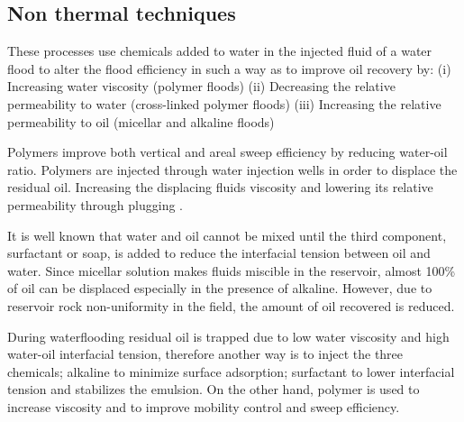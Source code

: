 \subsection{Non thermal techniques}
\begin{description}[style=nextline]
\item[\textbf{Chemical Flooding}]
These processes use chemicals added to water in the injected fluid of a water 
flood to alter the flood efficiency in such a way as to improve oil recovery by: 
(i) Increasing water viscosity (polymer floods) (ii) Decreasing the relative 
permeability to water (cross-linked polymer floods) (iii) Increasing the 
relative permeability to oil (micellar and alkaline floods)  \citep{Glover} 
\item[\textbf{Polymer flooding}]
Polymers improve both vertical and areal sweep efficiency by 
reducing water-oil ratio. Polymers are injected through water injection wells in 
order to displace the residual oil. Increasing the displacing fluids viscosity 
and lowering its relative permeability through plugging \citep{Anazi}. 
\item[\textbf{Micelalr polymer flooding}]
It is well known that water and oil cannot be mixed 
until the third component, surfactant or soap, is added to reduce the 
interfacial tension between oil and water. Since micellar solution makes fluids 
miscible in the reservoir, almost 100\% of oil can be displaced especially in the 
presence of alkaline. However, due to reservoir rock non-uniformity in the field, the amount of oil recovered is reduced. 
\item[\textbf{Alkaline-surfactant-polymer (ASP) flooding}]
During waterflooding residual oil is 
trapped due to low water viscosity and high water-oil interfacial tension, 
therefore another way is to inject the three chemicals; alkaline to minimize 
surface adsorption; surfactant to lower interfacial tension and stabilizes the 
emulsion. On the other hand, polymer is used to increase viscosity and to 
improve mobility control and sweep efficiency\citep{Kirk}. 
\end{description}
